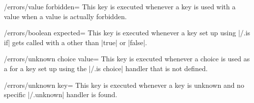 \begin{key}{/errors/value forbidden=}
    This key is executed whenever a key is used with a value when a value is
    actually forbidden.
\end{key}

\begin{key}{/errors/boolean expected=}
    This key is executed whenever a key set up using |/.is if| gets called with
    a  other than |true| or |false|.
\end{key}

\begin{key}{/errors/unknown choice value=}
    This key is executed whenever a choice is used as a  for a key
    set up using the |/.is choice| handler that is not defined.
\end{key}

\begin{key}{/errors/unknown key=}
    This key is executed whenever a key is unknown and no specific |/.unknown|
    handler is found.
\end{key}




